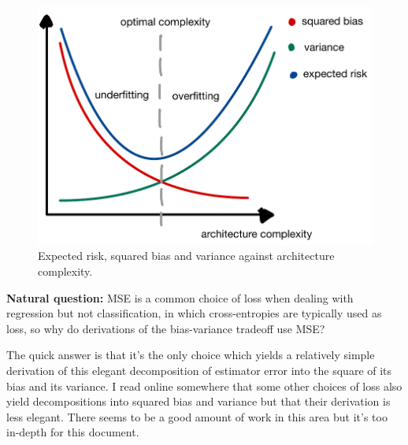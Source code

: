 \documentclass[11pt]{article}
\begin{document}
\begin{figure}[t]
    \centering
    \begin{minipage}{0.64\linewidth}
        \includegraphics[width=\linewidth]{./figures/supervised_learning/bias_variance.pdf}
    \end{minipage}%
    \hfill
    \begin{minipage}{0.35\linewidth}
        \caption{Expected risk, squared bias and variance against architecture complexity.}
        \label{fig:bias_variance}
    \end{minipage}
\end{figure}

\begin{tcolorbox}[title={\centering\textbf{Beyond MSE}}, colback=myLightBlue, colbacktitle=myDarkBlue, colframe=myDarkBlue, coltitle=white]
    \textbf{Natural question:} MSE is a common choice of loss when dealing with regression but not classification, in which cross-entropies are typically used as loss, so why do derivations of the bias-variance tradeoff use MSE?
    
    \hspace{14.2pt} The quick answer is that it's the only choice which yields a relatively simple derivation of this elegant decomposition of estimator error into the square of its bias and its variance. I read online somewhere that some other choices of loss also yield decompositions into squared bias and variance but that their derivation is less elegant. There seems to be a good amount of work in this area but it's too in-depth for this document.
\end{tcolorbox}
\end{document}
